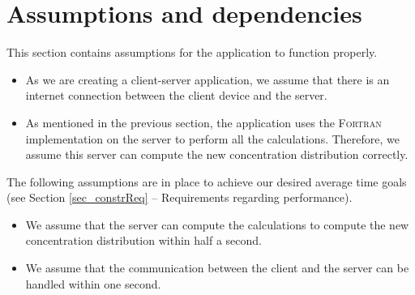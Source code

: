 \section{Assumptions and dependencies}
This section contains assumptions for the application to function properly.

\begin{itemize}
  \item As we are creating a client-server application, we assume that there is an internet connection between the client device and the server.
  \item As mentioned in the previous section, the application uses the \textsc{Fortran} implementation on the server to perform all the calculations. Therefore, we assume this server can compute the new concentration distribution correctly.
\end{itemize}

\noindent The following assumptions are in place to achieve our desired average time goals (see Section \ref{sec_constrReq} -- Requirements regarding performance).

\begin{itemize}
  \item We assume that the server can compute the calculations to compute the new concentration distribution within half a second.
  \item We assume that the communication between the client and the server can be handled within one second.
\end{itemize}

